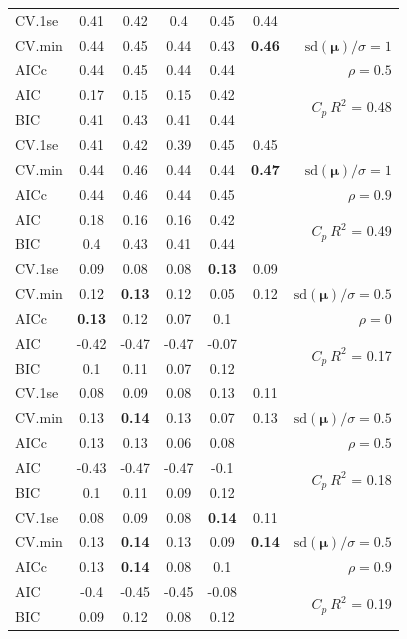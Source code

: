 \documentclass[12pt]{article}
\newcommand{\mr}[1]{\mathrm{#1}}
\newcommand{\bm}[1]{\mathbf{#1}}
\begin{document}
\begin{table}[p]
\begin{center}
\begin{tabular}{l*{5}{c}|r}
 \hline 
CV.1se & 0.41 & 0.42 & 0.4 & 0.45 & 0.44 &\\
CV.min & 0.44 & 0.45 & 0.44 & 0.43 & {\bf 0.46} &  $\mr{sd}(\bm{\mu})/\sigma=1$ \\
AICc & 0.44 & 0.45 & 0.44 & 0.44 & & $\rho=0.5$ \\
AIC & 0.17 & 0.15 & 0.15 & 0.42 & & \multirow{2}{*}{$C_p ~ R^2$ = 0.48} \\
BIC & 0.41 & 0.43 & 0.41 & 0.44 & & \\
 \hline 
CV.1se & 0.41 & 0.42 & 0.39 & 0.45 & 0.45 &\\
CV.min & 0.44 & 0.46 & 0.44 & 0.44 & {\bf 0.47} &  $\mr{sd}(\bm{\mu})/\sigma=1$ \\
AICc & 0.44 & 0.46 & 0.44 & 0.45 & & $\rho=0.9$ \\
AIC & 0.18 & 0.16 & 0.16 & 0.42 & & \multirow{2}{*}{$C_p ~ R^2$ = 0.49} \\
BIC & 0.4 & 0.43 & 0.41 & 0.44 & & \\
 \hline 
CV.1se & 0.09 & 0.08 & 0.08 & {\bf 0.13} & 0.09 &\\
CV.min & 0.12 & {\bf 0.13} & 0.12 & 0.05 & 0.12 &  $\mr{sd}(\bm{\mu})/\sigma=0.5$ \\
AICc & {\bf 0.13} & 0.12 & 0.07 & 0.1 & & $\rho=0$ \\
AIC & -0.42 & -0.47 & -0.47 & -0.07 & & \multirow{2}{*}{$C_p ~ R^2$ = 0.17} \\
BIC & 0.1 & 0.11 & 0.07 & 0.12 & & \\
 \hline 
CV.1se & 0.08 & 0.09 & 0.08 & 0.13 & 0.11 &\\
CV.min & 0.13 & {\bf 0.14} & 0.13 & 0.07 & 0.13 &  $\mr{sd}(\bm{\mu})/\sigma=0.5$ \\
AICc & 0.13 & 0.13 & 0.06 & 0.08 & & $\rho=0.5$ \\
AIC & -0.43 & -0.47 & -0.47 & -0.1 & & \multirow{2}{*}{$C_p ~ R^2$ = 0.18} \\
BIC & 0.1 & 0.11 & 0.09 & 0.12 & & \\
 \hline 
CV.1se & 0.08 & 0.09 & 0.08 & {\bf 0.14} & 0.11 &\\
CV.min & 0.13 & {\bf 0.14} & 0.13 & 0.09 & {\bf 0.14} &  $\mr{sd}(\bm{\mu})/\sigma=0.5$ \\
AICc & 0.13 & {\bf 0.14} & 0.08 & 0.1 & & $\rho=0.9$ \\
AIC & -0.4 & -0.45 & -0.45 & -0.08 & & \multirow{2}{*}{$C_p ~ R^2$ = 0.19} \\
BIC & 0.09 & 0.12 & 0.08 & 0.12 & & \\
 \hline 
\end{tabular}
\end{center}
\vspace{-1cm}
\end{table}
\end{document}
